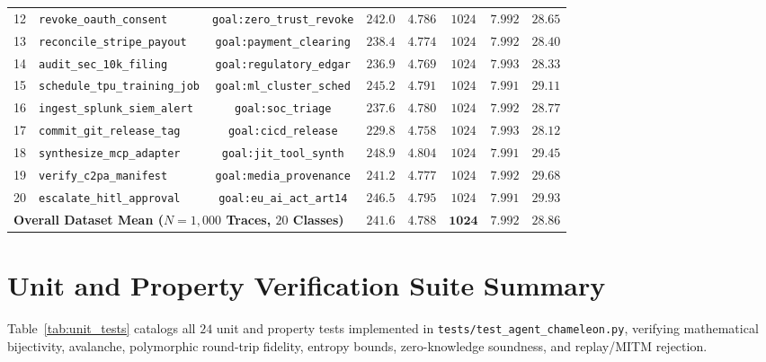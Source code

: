 \documentclass[conference,10pt]{IEEEtran}
\begin{document}
\begin{table}[t!]
{\begin{tabular}{clcccccc}
12 & \texttt{revoke\_oauth\_consent} & \texttt{goal:zero\_trust\_revoke} & $242.0$ & $4.786$ & $1024$ & $7.992$ & $28.65$ \\
13 & \texttt{reconcile\_stripe\_payout} & \texttt{goal:payment\_clearing} & $238.4$ & $4.774$ & $1024$ & $7.992$ & $28.40$ \\
14 & \texttt{audit\_sec\_10k\_filing} & \texttt{goal:regulatory\_edgar} & $236.9$ & $4.769$ & $1024$ & $7.993$ & $28.33$ \\
15 & \texttt{schedule\_tpu\_training\_job} & \texttt{goal:ml\_cluster\_sched} & $245.2$ & $4.791$ & $1024$ & $7.991$ & $29.11$ \\
16 & \texttt{ingest\_splunk\_siem\_alert} & \texttt{goal:soc\_triage} & $237.6$ & $4.780$ & $1024$ & $7.992$ & $28.77$ \\
17 & \texttt{commit\_git\_release\_tag} & \texttt{goal:cicd\_release} & $229.8$ & $4.758$ & $1024$ & $7.993$ & $28.12$ \\
18 & \texttt{synthesize\_mcp\_adapter} & \texttt{goal:jit\_tool\_synth} & $248.9$ & $4.804$ & $1024$ & $7.991$ & $29.45$ \\
19 & \texttt{verify\_c2pa\_manifest} & \texttt{goal:media\_provenance} & $241.2$ & $4.777$ & $1024$ & $7.992$ & $29.68$ \\
20 & \texttt{escalate\_hitl\_approval} & \texttt{goal:eu\_ai\_act\_art14} & $246.5$ & $4.795$ & $1024$ & $7.991$ & $29.93$ \\
\midrule
\multicolumn{3}{l}{\textbf{Overall Dataset Mean ($N = 1{,}000$ Traces, $20$ Classes)}} & $\mathbf{241.6}$ & $\mathbf{4.788}$ & $\mathbf{1024}$ & $\mathbf{7.992}$ & $\mathbf{28.86}$ \\
\bottomrule
\end{tabular}%
}
\end{table}

\section{Unit and Property Verification Suite Summary}
\label{app:tests}
Table~\ref{tab:unit_tests} catalogs all $24$ unit and property tests implemented in \texttt{tests/test\_agent\_chameleon.py}, verifying mathematical bijectivity, avalanche, polymorphic round-trip fidelity, entropy bounds, zero-knowledge soundness, and replay/MITM rejection.
\end{document}
